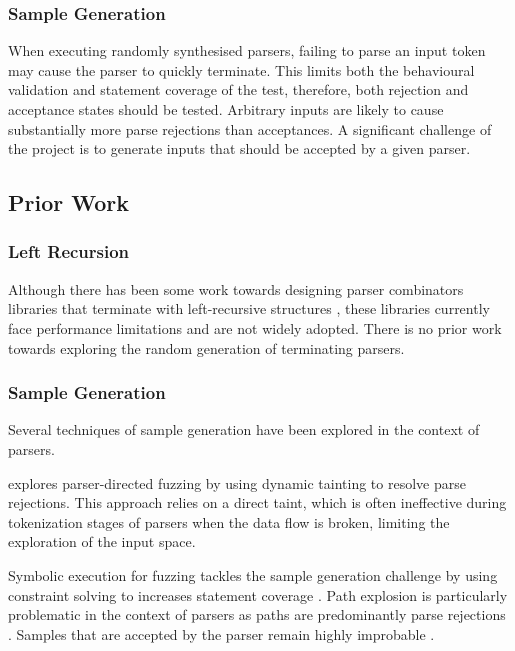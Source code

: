 \documentclass{article}
\let\oldciteauthor\citeauthor
\renewcommand{\citeauthor}[1]{\oldciteauthor{#1} \cite{#1}}
\begin{document}
\subsubsection{Sample Generation}
When executing randomly synthesised parsers, failing to parse an input token may cause the parser to quickly terminate. This limits both the behavioural validation and statement coverage of the test, therefore, both rejection and acceptance states should be tested. Arbitrary inputs are likely to cause substantially more parse rejections than acceptances. A significant challenge of the project is to generate inputs that should be accepted by a given parser.

\subsection{Prior Work}

\subsubsection{Left Recursion}
Although there has been some work towards designing parser combinators libraries that terminate with left-recursive structures \cite{left-recursive-detect}, these libraries currently face performance limitations and are not widely adopted. There is no prior work towards exploring the random generation of terminating parsers. 

\subsubsection{Sample Generation}

Several techniques of sample generation have been explored in the context of parsers. 

\citeauthor{parser-directed} explores parser-directed fuzzing by using dynamic tainting to resolve parse rejections. This approach relies on a direct taint, which is often ineffective during tokenization stages of parsers when the data flow is broken, limiting the exploration of the input space.

Symbolic execution for fuzzing tackles the sample generation challenge by using constraint solving to increases statement coverage \cite{klee}. Path explosion is particularly problematic in the context of parsers as paths are predominantly parse rejections \cite{path-explosion}. Samples that are accepted by the parser remain highly improbable \cite{parser-directed}.
\end{document}
